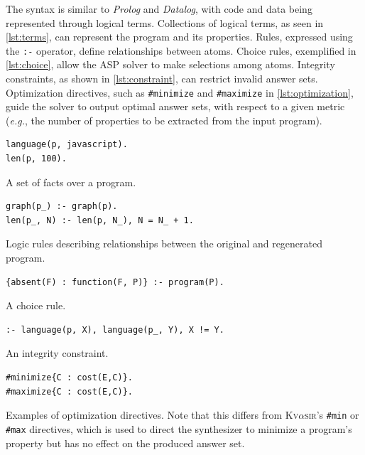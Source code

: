 \documentclass[nonacm,sigplan,review]{acmart}
\def\eg{{\em e.g.}, }
\newcommand{\sys}{{\scshape Kv{$\alpha$}sir}\xspace}
\newcommand{\ttt}[1]{\texttt{#1}\xspace}
\begin{document}
The syntax is similar to \textit{Prolog} and \textit{Datalog}, with code and data being represented
through logical terms.
Collections of logical terms, as seen in
\cref{lst:terms}, can represent the program and its properties.
Rules, expressed using
the \ttt{:-} operator, define relationships
between atoms.
Choice rules, exemplified in \cref{lst:choice}, allow the ASP
solver to make selections among atoms.
Integrity constraints, as shown in
\cref{lst:constraint}, can restrict invalid answer sets. Optimization
directives, such as \ttt{\#minimize} and \ttt{\#maximize} in
\cref{lst:optimization}, guide the solver to output optimal answer sets,
with respect to a given metric (\eg the number of properties to be extracted from the input program).

\begin{listing}
\begin{verbatim}
language(p, javascript).
len(p, 100).
\end{verbatim}
\caption{A set of facts over a program.}
\label{lst:terms}
\end{listing}

\begin{listing}
\begin{verbatim}
graph(p_) :- graph(p).
len(p_, N) :- len(p, N_), N = N_ + 1.
\end{verbatim}
\caption{Logic rules describing relationships between the original and regenerated program.}
\label{lst:rules}
\end{listing}

\begin{listing}
\begin{verbatim}
{absent(F) : function(F, P)} :- program(P).
\end{verbatim}
\caption{A choice rule.}
\label{lst:choice}
\end{listing}

\begin{listing}
\begin{verbatim}
:- language(p, X), language(p_, Y), X != Y.
\end{verbatim}
\caption{An integrity constraint.}
\label{lst:constraint}
\end{listing}

\begin{listing}
\begin{verbatim}
#minimize{C : cost(E,C)}.
#maximize{C : cost(E,C)}.
\end{verbatim}
\caption{Examples of optimization directives. Note that this differs from \sys's \ttt{\#min} or \ttt{\#max} directives, which is used to direct the synthesizer to minimize a program's property but has no effect on the produced answer set.}
\label{lst:optimization}
\end{listing}
\end{document}

